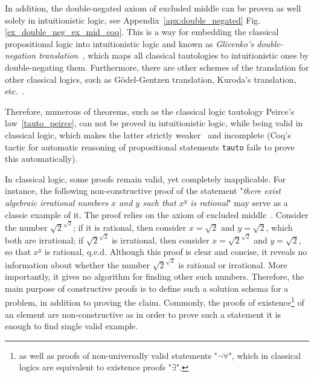 \documentclass[article]{aaltoseries}
\begin{document}
In addition, the double-negated axiom of excluded middle can be proven as well solely in intuitionistic logic, see Appendix~\ref{apx:double_negated} Fig.\ref{ex_double_neg_ex_mid_coq}. This is a way for embedding the classical propositional logic into intuitionistic logic and known as \textit{Glivenko's double-negation translation}~\cite{Glivenko29}, which maps all classical tautologies to intuitionistic ones by double-negating them. Furthermore, there are other schemes of the translation for other classical logics, such as Gödel-Gentzen translation, Kuroda's translation, etc.~\cite{Kolmogorov25}.

Therefore, numerous of theorems, such as the classical logic tautology Peirce's law~\eqref{tauto_peirce}, can not be proved in intuitionistic logic, while being valid in classical logic, which makes the latter strictly weaker~\cite{Rush14} and incomplete (Coq's tactic for automatic reasoning of propositional statements \texttt{tauto} fails to prove this automatically).

In classical logic, some proofs remain valid, yet completely inapplicable. For instance, the following non-constructive proof of the statement "\textit{there exist algebraic irrational numbers $x$ and $y$ such that $x^y$ is rational}" may serve as a classic example of it.
The proof relies on the axiom of excluded middle~\cite{Harrison09}. Consider the number $\sqrt{2}^{\sqrt{2}}$; if it is rational, then consider $x = \sqrt{2}$ and $y = \sqrt{2}$, which both are irrational; if $\sqrt{2}^{\sqrt{2}}$ is irrational, then consider $x = \sqrt{2}^{\sqrt{2}}$ and $y = \sqrt{2}$, so that $x^{y}$ is rational, q.e.d. Although this proof is clear and concise, it reveals no information about whether the number $\sqrt{2}^{\sqrt{2}}$ is rational or irrational. More importantly, it gives no algorithm for finding other such numbers. Therefore, the main purpose of constructive proofs is to define such a solution schema for a problem, in addition to proving the claim.
Commonly, the proofs of existence\footnote{as well as proofs of non-universally valid statements "$\neg \forall$", which in classical logics are equivalent to existence proofs "$\exists$".} of an element are non-constructive as in order to prove such a statement it is enough to find single valid example.

\end{document}
